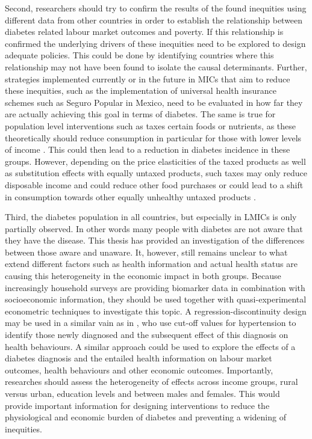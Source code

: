 Second, researchers should try to confirm the results of the found inequities using different data from other countries in order to establish the relationship between diabetes related labour market outcomes and poverty. If this relationship is confirmed the underlying drivers of these inequities need to be explored to design adequate policies. This could be done by identifying countries where this relationship may not have been found to isolate the causal determinants. Further, strategies implemented currently or in the future in \acp{MIC} that aim to reduce these inequities, such as the implementation of universal health insurance schemes such as Seguro Popular in Mexico, need to be evaluated in how far they are actually achieving this goal in terms of diabetes. The same is true for population level interventions such as taxes certain foods or nutrients, as these theoretically should reduce consumption in particular for those with lower levels of income \parencite{Mytton2012c}. This could then lead to a reduction in diabetes incidence in these groups. However, depending on the price elasticities of the taxed products as well as substitution effects with equally untaxed products, such taxes may only reduce disposable income and could reduce other food purchases or could lead to a shift in consumption towards other equally unhealthy untaxed products \parencite{Mytton2012c}.


Third, the diabetes population in all countries, but especially in \acp{LMIC} is only partially observed. In other words many people with diabetes are not aware that they have the disease. This thesis has provided an investigation of the differences between those aware and unaware. It, however, still remains unclear to what extend different factors such as health information and actual health status are causing this heterogeneity in the economic impact in both groups. Because increasingly household surveys are providing biomarker data in combination with socioeconomic information, they should be used together with quasi-experimental econometric techniques to investigate this topic. A regression-discontinuity design may be used in a similar vain as in \textcite{Zhao2013a}, who use cut-off values for hypertension to identify those newly diagnosed and the subsequent effect of this diagnosis on health behaviours. A similar approach could be used to explore the effects of a diabetes diagnosis and the entailed health information on labour market outcomes, health behaviours and other economic outcomes. Importantly, researches should assess the heterogeneity of effects across income groups, rural versus urban, education levels and between males and females. This would provide important information for designing interventions to reduce the physiological and economic burden of diabetes and preventing a widening of inequities.

